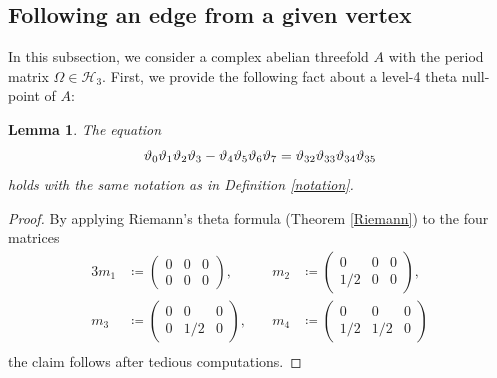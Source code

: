 \documentclass{amsart}
\theoremstyle{definition}
\theoremstyle{plain}
\newtheorem{Lem}[Def]{Lemma}
\begin{document}
\subsection{Following an edge from a given vertex}\label{one}
In this subsection, we consider a complex abelian threefold $A$ with the period matrix $\varOmega \in \mathcal{H}_3$.
{First, we provide the following fact about a level-4 theta null-point of $A$:}
\begin{Lem}\label{01234567}
The equation
\[
    \vartheta_0\vartheta_1\vartheta_2\vartheta_3 - \vartheta_4\vartheta_5\vartheta_6\vartheta_7 = \vartheta_{32}\vartheta_{33}\vartheta_{34}\vartheta_{35}\smallskip
\]
holds with the same notation {as} in Definition \ref{notation}.
\end{Lem}
\begin{proof}
{By applying Riemann's theta formula (Theorem \ref{Riemann}) to the four matrices}
\begin{alignat*}{3}
    m_1 &\coloneqq \begin{pmatrix}
    0 & 0 & 0\\
    0 & 0 & 0
    \end{pmatrix}, \quad & m_2 &\coloneqq \begin{pmatrix}
    0 & 0 & 0\\
    1/2 & 0 & 0
    \end{pmatrix},\\
    m_3 &\coloneqq \begin{pmatrix}
    0 & 0 & 0\\
    0 & 1/2 & 0
    \end{pmatrix}, \quad & m_4 &\coloneqq \begin{pmatrix}
    0 & 0 & 0\\
    1/2 & 1/2 & 0
    \end{pmatrix}\\[-4.7mm]
\end{alignat*}
the claim follows after tedious computations.
\end{proof}\medskip
\end{document}
